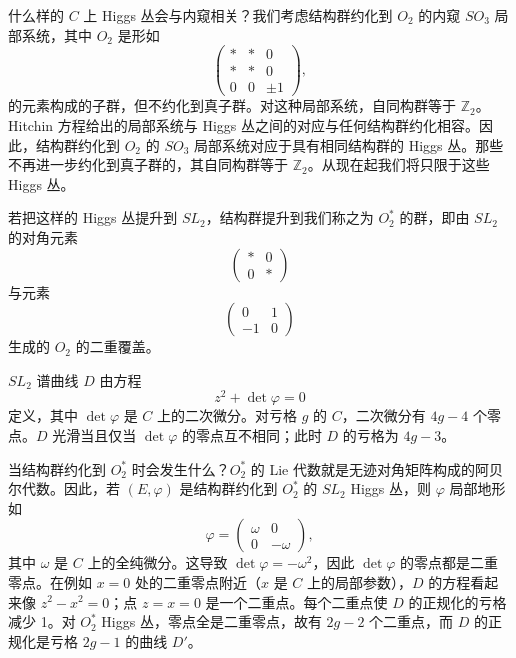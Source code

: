 什么样的 $C$ 上 Higgs 丛会与内窥相关？我们考虑结构群约化到 $O_2$ 的内窥 $SO_3$ 局部系统，其中 $O_2$ 是形如
\begin{equation}\tag{5.7}
\begin{pmatrix}
* & * & 0\\
* & * & 0\\
0 & 0 & \pm 1
\end{pmatrix},
\end{equation}
的元素构成的子群，但不约化到真子群。对这种局部系统，自同构群等于 $\mathbb{Z}_2$。Hitchin 方程给出的局部系统与 Higgs 丛之间的对应与任何结构群约化相容。因此，结构群约化到 $O_2$ 的 $SO_3$ 局部系统对应于具有相同结构群的 Higgs 丛。那些不再进一步约化到真子群的，其自同构群等于 $\mathbb{Z}_2$。从现在起我们将只限于这些 Higgs 丛。


若把这样的 Higgs 丛提升到 $SL_2$，结构群提升到我们称之为 $O_2^*$ 的群，即由 $SL_2$ 的对角元素
\begin{equation}\tag{5.8}
\begin{pmatrix}
* & 0\\
0 & *
\end{pmatrix}
\end{equation}
与元素
\begin{equation}\tag{5.9}
\begin{pmatrix}
0 & 1\\
-1 & 0
\end{pmatrix}
\end{equation}
生成的 $O_2$ 的二重覆盖。

$SL_2$ 谱曲线 $D$ 由方程
\begin{equation}\tag{5.10}
z^2 + \det\varphi = 0
\end{equation}
定义，其中 $\det\varphi$ 是 $C$ 上的二次微分。对亏格 $g$ 的 $C$，二次微分有 $4g-4$ 个零点。$D$ 光滑当且仅当 $\det\varphi$ 的零点互不相同；此时 $D$ 的亏格为 $4g-3$。

当结构群约化到 $O_2^*$ 时会发生什么？$O_2^*$ 的 Lie 代数就是无迹对角矩阵构成的阿贝尔代数。因此，若 $(E,\varphi)$ 是结构群约化到 $O_2^*$ 的 $SL_2$ Higgs 丛，则 $\varphi$ 局部地形如
\begin{equation}\tag{5.11}
\varphi = \begin{pmatrix}
\omega & 0\\
0 & -\omega
\end{pmatrix},
\end{equation}
其中 $\omega$ 是 $C$ 上的全纯微分。这导致 $\det\varphi = -\omega^2$，因此 $\det\varphi$ 的零点都是二重零点。在例如 $x=0$ 处的二重零点附近（$x$ 是 $C$ 上的局部参数），$D$ 的方程看起来像 $z^2-x^2=0$；点 $z=x=0$ 是一个二重点。每个二重点使 $D$ 的正规化的亏格减少 1。对 $O_2^*$ Higgs 丛，零点全是二重零点，故有 $2g-2$ 个二重点，而 $D$ 的正规化是亏格 $2g-1$ 的曲线 $D'$。

